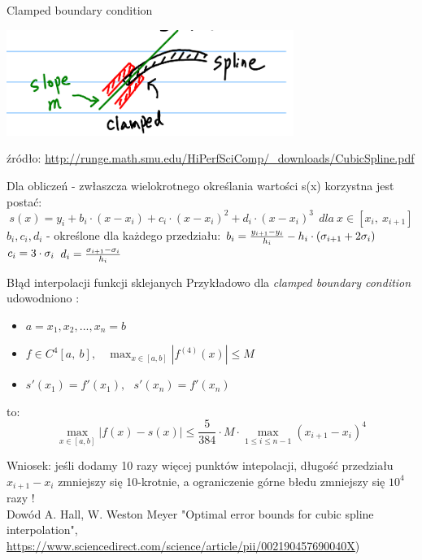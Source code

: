     \begin{frame}{Clamped boundary condition}
   
        \includegraphics[width=0.7\textwidth]{img/4/clamped.png}
        
         źródło: \url{http://runge.math.smu.edu/HiPerfSciComp/_downloads/CubicSpline.pdf}
    \end{frame}
    \begin{frame}
    
        	Dla obliczeń - zwłaszcza wielokrotnego określania wartości s(x) 
            korzystna jest postać:
            \[
            	s(x)=y_{i}+b_{i}\cdot(x-x_{i})+c_{i}
                \cdot(x-x_{i})^{2}+d_{i}\cdot(x-x_{i})^{3}
                \ \ dla \ x\in[x_{i},\ x_{i+1}]
            \]
            $b_{i}, c_{i}, d_{i}$ - określone dla każdego przedziału:
            $b_{i}=\frac{y_{i+1}-y_{i}}{h_{i}}-h_{i}\cdot (\sigma_{i+1}
            +2\sigma_{i})\newline$
            $c_{i}=3\cdot \sigma_{i}\newline$
            $d_{i}=\frac{\sigma_{i+1}-\sigma_{i}}{h_{i}}\newline$

        
    \end{frame}
    \begin{frame}{Błąd interpolacji funkcji sklejanych}
    	Przykładowo dla {\it clamped boundary condition} udowodniono :
        \begin{itemize}
        \item $a=x_{1}, x_{2}, . . . , x_{n}=b$
        \item $f\in C^{4}[a,\ b] , \ \ \ \ \max_{x\in[a,b]}|f^{(4)}
        (x)|\leq M$
        \item $s'(x_{1})=f'(x_{1}), \ \ \ s'(x_{n})=f'(x_{n})$
        \end{itemize}
        to:
        \[
        	\max_{x\in[a,b]}|f(x)-s(x)|\leq \frac{5}{384} \cdot
            M \cdot \max_{1 \leq i \leq n-1}(x_{i+1}-x_{i})^{4}
        \]
        
        Wniosek:  jeśli dodamy 10 razy więcej punktów intepolacji, długość przedziału 
        $x_{i+1}-x_{i}$ zmniejszy się 10-krotnie, a ograniczenie górne błedu zmniejszy się $10^4$ razy !\\
        \small{
        Dowód A. Hall, W. Weston Meyer "Optimal error bounds for cubic spline interpolation",  \url{https://www.sciencedirect.com/science/article/pii/002190457690040X})}
    \end{frame}
    
